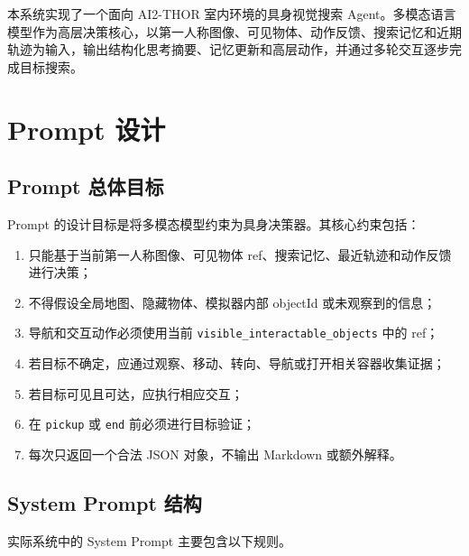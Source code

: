 \documentclass[UTF8,a4paper,12pt]{ctexart}
\begin{document}
本系统实现了一个面向 AI2-THOR 室内环境的具身视觉搜索 Agent。多模态语言模型作为高层决策核心，以第一人称图像、可见物体、动作反馈、搜索记忆和近期轨迹为输入，输出结构化思考摘要、记忆更新和高层动作，并通过多轮交互逐步完成目标搜索。



\appendix

\section{Prompt 设计}

\subsection{Prompt 总体目标}

Prompt 的设计目标是将多模态模型约束为具身决策器。其核心约束包括：

\begin{enumerate}
    \item 只能基于当前第一人称图像、可见物体 ref、搜索记忆、最近轨迹和动作反馈进行决策；
    \item 不得假设全局地图、隐藏物体、模拟器内部 objectId 或未观察到的信息；
    \item 导航和交互动作必须使用当前 \texttt{visible\_interactable\_objects} 中的 ref；
    \item 若目标不确定，应通过观察、移动、转向、导航或打开相关容器收集证据；
    \item 若目标可见且可达，应执行相应交互；
    \item 在 \texttt{pickup} 或 \texttt{end} 前必须进行目标验证；
    \item 每次只返回一个合法 JSON 对象，不输出 Markdown 或额外解释。
\end{enumerate}

\subsection{System Prompt 结构}

实际系统中的 System Prompt 主要包含以下规则。
\end{document}
